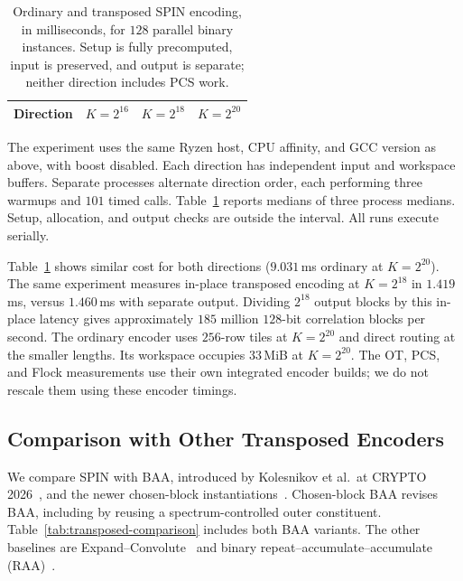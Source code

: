 \begin{table}[tb]
\centering
\caption{Ordinary and transposed SPIN encoding, in milliseconds, for
$128$ parallel binary instances. Setup is fully precomputed, input is
preserved, and output is separate; neither direction includes PCS work.}
\label{tab:ordinary-encoding}
\begin{tabular}{@{}lrrr@{}}
\toprule
Direction & $K=2^{16}$ & $K=2^{18}$ & $K=2^{20}$ \\
\midrule

\end{tabular}
\end{table}

The experiment uses the same Ryzen host, CPU affinity, and GCC version
as above, with boost disabled. Each direction has independent input and
workspace buffers. Separate processes alternate direction order, each
performing three warmups and $101$ timed calls.
Table~\ref{tab:ordinary-encoding} reports medians of three process medians.
Setup, allocation, and output checks are outside the interval.
All runs execute serially.

Table~\ref{tab:ordinary-encoding} shows similar cost for both directions
($9.031$\,ms ordinary at $K=2^{20}$).
The same experiment measures in-place transposed encoding at
$K=2^{18}$ in $1.419$\,ms, versus $1.460$\,ms with separate output.
Dividing $2^{18}$ output blocks by this in-place latency gives approximately
$185$ million $128$-bit correlation blocks per second.
The ordinary encoder uses $256$-row tiles at $K=2^{20}$ and direct routing
at the smaller lengths. Its workspace occupies $33$\,MiB at $K=2^{20}$.
The OT, PCS, and Flock measurements use their own integrated encoder
builds; we do not rescale them using these encoder timings.

\subsection{Comparison with Other Transposed Encoders}
\label{app:transposed-comparison-details}

We compare SPIN with BAA, introduced by Kolesnikov et al.\ at CRYPTO
2026~\cite{KolesnikovEtAl2026BA}, and the newer chosen-block
instantiations~\cite{cryptoeprint:2026/1903}. Chosen-block BAA revises
BAA, including by reusing a spectrum-controlled outer constituent. Table~\ref{tab:transposed-comparison}
includes both BAA variants. The other baselines are
Expand--Convolute~\cite{RaghuramanRindalTanguy2023EC} and binary
repeat--accumulate--accumulate (RAA)~\cite{blaze25}.

